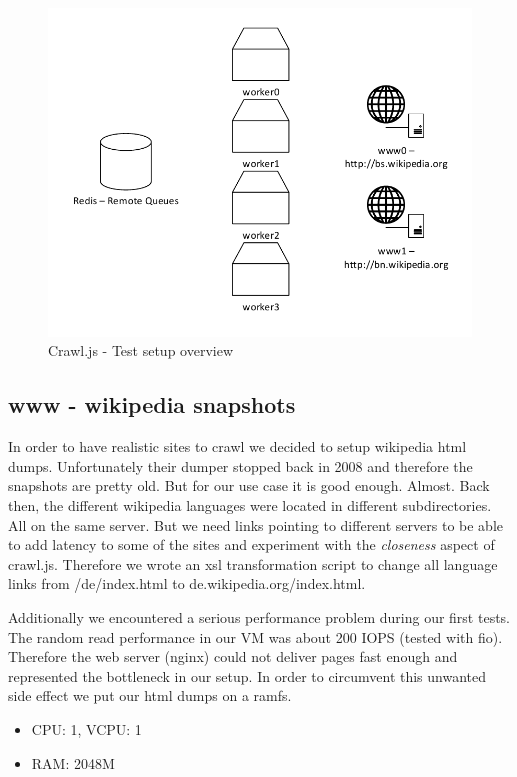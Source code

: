 \begin{figure}[h]
\centering
  \includegraphics[width=1.0\textwidth]{Figures/experiments_setup.pdf}
\caption{Crawl.js - Test setup overview}
\label{test_setup}
\end{figure}

\subsection{www - wikipedia snapshots}
In order to have realistic sites to crawl we decided to setup wikipedia html dumps. Unfortunately their dumper stopped back in 2008 and therefore the snapshots are pretty old. But for our use case it is good enough. Almost. Back then, the different wikipedia languages were located in different subdirectories. All on the same server. But we need links pointing to different servers to be able to add latency to some of the sites and experiment with the \emph{closeness} aspect of crawl.js. Therefore we wrote an xsl transformation script to change all language links from /de/index.html to de.wikipedia.org/index.html.


Additionally we encountered a serious performance problem during our first tests. The random read performance in our VM was about 200 IOPS (tested with fio). Therefore the web server (nginx) could not deliver pages fast enough and represented the bottleneck in our setup. In order to circumvent this unwanted side effect we put our html dumps on a ramfs.

\begin{itemize}
  \item CPU: 1, VCPU: 1
  \item RAM: 2048M
\end{itemize}

